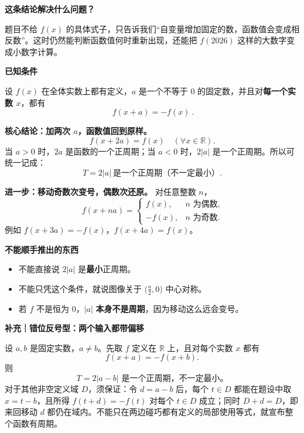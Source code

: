 \begin{statementbox}


\textbf{这条结论解决什么问题？}

题目不给 $f(x)$ 的具体式子，只告诉我们“自变量增加固定的数，函数值会变成相反数”。这时仍然能判断函数值何时重新出现，还能把 $f(2026)$ 这样的大数字变成小数字计算。

\medskip
\textbf{已知条件}

设 $f(x)$ 在全体实数上都有定义，$a$ 是一个不等于 $0$ 的固定数，并且对\textbf{每一个实数 $x$}，都有
\[
\boxed{\ f(x+a)=-f(x)\ }.
\]

\textbf{核心结论：加两次 $a$，函数值回到原样。}
\[
\boxed{\ f(x+2a)=f(x)\quad(\forall x\in\mathbb R).\ }
\]
当 $a>0$ 时，$2a$ 是函数的一个正周期；当 $a<0$ 时，$2|a|$ 是一个正周期。所以可统一记成：
\[
\boxed{\ T=2|a|\ \text{是一个正周期（不一定最小）}.\ }
\]

\end{statementbox}\clearpage\begin{statementbox}\textbf{进一步：移动奇数次变号，偶数次还原。} 对任意整数 $n$，
\[
\boxed{\ f(x+na)=
\begin{cases}
 f(x),&n\text{ 为偶数},\\
 -f(x),&n\text{ 为奇数}.
\end{cases} }
\]
例如 $f(x+3a)=-f(x)$，$f(x+4a)=f(x)$。

\medskip
\textbf{不能顺手推出的东西}
\begin{itemize}[leftmargin=*,itemsep=0.25em]
\item 不能直接说 $2|a|$ 是\textbf{最小}正周期。
\item 不能只凭这个条件，就说图像关于 $\bigl(\frac a2,0\bigr)$ 中心对称。
\item 若 $f$ 不是恒为 $0$，$|a|$ \textbf{本身不是周期}，因为移动这么远会变号。
\end{itemize}
\end{statementbox}
\clearpage
\begin{statementbox}
\textbf{补充｜错位反号型：两个输入都带偏移}

设 $a,b$ 是固定实数，$a\ne b$。先取 $f$ 定义在 $\mathbb R$ 上，且对每个实数 $x$ 都有
\[f(x+a)=-f(x+b).\]
则
\[\boxed{T=2|a-b|\text{ 是一个正周期，不一定最小。}}\]
对于其他非空定义域 $D$，须保证：令 $d=a-b$ 后，每个 $t\in D$ 都能在题设中取 $x=t-b$，且所得 $f(t+d)=-f(t)$ 对每个 $t\in D$ 成立；同时 $D+d=D$，即来回移动 $d$ 都仍在域内。不能只在两边碰巧都有定义的局部使用等式，就宣布整个函数有周期。


\end{statementbox}
